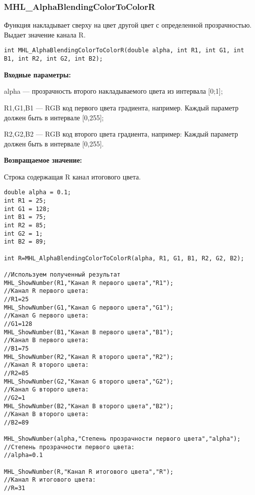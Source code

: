 \documentclass[a4paper,12pt]{article}
\begin{document}
\subsubsection{MHL\_AlphaBlendingColorToColorR}\label{MHL_AlphaBlendingColorToColorR}

Функция накладывает сверху на цвет другой цвет с определенной прозрачностью. Выдает значение канала R.


\begin{lstlisting}[label=code_syntax_MHL_AlphaBlendingColorToColorR,caption=Синтаксис]
int MHL_AlphaBlendingColorToColorR(double alpha, int R1, int G1, int B1, int R2, int G2, int B2);
\end{lstlisting}

\textbf{Входные параметры:}  

alpha --- прозрачность второго накладываемого цвета из интервала [0;1];
 
    R1,G1,B1 --- RGB код первого цвета градиента, например. Каждый параметр должен быть в интервале [0,255];
 
    R2,G2,B2 --- RGB код второго цвета градиента, например: Каждый параметр должен быть в интервале [0,255].

\textbf{Возвращаемое значение:}

Строка содержащая R канал итогового цвета.


\begin{lstlisting}[label=code_use_MHL_AlphaBlendingColorToColorR,caption=Пример использования]
double alpha = 0.1;
int R1 = 25;
int G1 = 128;
int B1 = 75;
int R2 = 85;
int G2 = 1;
int B2 = 89;

int R=MHL_AlphaBlendingColorToColorR(alpha, R1, G1, B1, R2, G2, B2);

//Используем полученный результат
MHL_ShowNumber(R1,"Канал R первого цвета","R1");
//Канал R первого цвета:
//R1=25
MHL_ShowNumber(G1,"Канал G первого цвета","G1");
//Канал G первого цвета:
//G1=128
MHL_ShowNumber(B1,"Канал B первого цвета","B1");
//Канал B первого цвета:
//B1=75
MHL_ShowNumber(R2,"Канал R второго цвета","R2");
//Канал R второго цвета:
//R2=85
MHL_ShowNumber(G2,"Канал G второго цвета","G2");
//Канал G второго цвета:
//G2=1
MHL_ShowNumber(B2,"Канал B второго цвета","B2");
//Канал B второго цвета:
//B2=89

MHL_ShowNumber(alpha,"Степень прозрачности первого цвета","alpha");
//Степень прозрачности первого цвета:
//alpha=0.1

MHL_ShowNumber(R,"Канал R итогового цвета","R");
//Канал R итогового цвета:
//R=31
\end{lstlisting}
\end{document}
